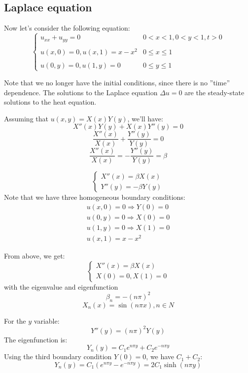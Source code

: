 \documentclass[12pt]{article} %
\begin{document}
\subsection{Laplace equation}
\hspace{5mm}
Now let's consider the following equation:
\begin{equation}
\left\{
\begin{array}{lll}
u_{xx} + u_{yy} = 0 & 0<x<1, 0<y<1, t>0\\
 \\
 u(x, 0)=0,  u(x, 1)=x - x^{2} & 0 \leq x \leq 1\\ \\
  u(0,y)=0,  u(1, y)=0 &  0 \leq y \leq 1
\end{array}\right.
\end{equation}\par
Note that we no longer have the initial conditions, since there is no ''time'' dependence. The solutions to the Laplace equation $\Delta u = 0$ are the steady-state solutions to the heat equation. \par
Assuming that $u(x, y) = X(x)Y(y)$, we'll have:
$$
X''(x)Y(y)+X(x)Y''(y) =0
$$
$$
 \frac{X''(x)}{X(x)}+\frac{Y''(y)}{Y(y)} =0
$$
$$
 \frac{X''(x)}{X(x)}=-\frac{Y''(y)}{Y(y)}=\beta
$$\par
$$
\left\{
\begin{array}{lll}
X''(x) = \beta X(x)\\
Y''(y) = -\beta Y(y)
\end{array}\right.
$$
Note that we have three homogeneous boundary conditions:
$$
\begin{array}{lll}
u(x, 0) = 0 \Rightarrow Y(0) = 0\\
u(0, y) = 0 \Rightarrow X(0) = 0\\
u(1, y) = 0 \Rightarrow X(1) = 0\\
u(x, 1) = x-x^{2} 
\end{array}
$$\par
From above, we get:
$$
\left\{
\begin{array}{lll}
X''(x) = \beta X(x)\\
X(0)=0, X(1)=0
\end{array}\right.
$$ with the eigenvalue and eigenfunction
$$
\beta_{n} = -(n\pi)^{2}
$$
$$
X_{n}(x) = \sin(n\pi x), n \in N
$$\par
For the $y$ variable:
$$
Y''(y) = (n\pi)^{2}Y(y)
$$The eigenfunction is:
$$
Y_{n}(y)=C_{1}e^{n\pi y} +C_{2}e^{-n\pi y}
$$Using the third boundary condition $Y(0) = 0$, we have $C_{1}+C_{2}$:
$$
Y_{n}(y)= C_{1}(e^{n\pi y}-e^{-n\pi y})=2C_{1}\sinh(n\pi y)
$$\par
\end{document}
